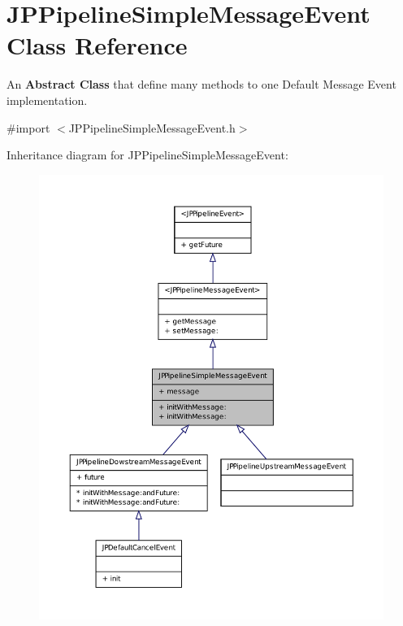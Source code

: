 \hypertarget{a00033}{
\section{JPPipelineSimpleMessageEvent Class Reference}
\label{a00033}
}


An {\bfseries Abstract Class} that define many methods to one Default Message Event implementation.  




{\ttfamily \#import $<$JPPipelineSimpleMessageEvent.h$>$}



Inheritance diagram for JPPipelineSimpleMessageEvent:\nopagebreak
\begin{figure}[H]
\begin{center}
\leavevmode
\includegraphics[width=400pt]{a00147}
\end{center}
\end{figure}


